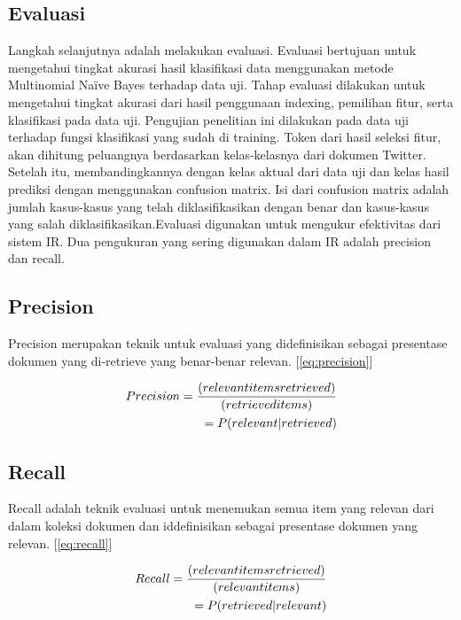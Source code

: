 \subsection*{Evaluasi}
Langkah selanjutnya adalah melakukan evaluasi. Evaluasi bertujuan untuk mengetahui tingkat akurasi hasil klasifikasi data menggunakan metode Multinomial Naïve Bayes terhadap data uji. Tahap evaluasi dilakukan untuk mengetahui tingkat akurasi dari hasil penggunaan indexing, pemilihan fitur, serta klasifikasi pada data uji. Pengujian penelitian ini dilakukan pada data uji terhadap fungsi klasifikasi yang sudah di training. Token dari hasil seleksi fitur, akan dihitung peluangnya berdasarkan kelas-kelasnya dari dokumen Twitter. Setelah itu, membandingkannya dengan kelas aktual dari data uji dan kelas hasil prediksi dengan menggunakan confusion matrix. Isi dari confusion matrix adalah jumlah kasus-kasus yang telah diklasifikasikan dengan benar dan kasus-kasus yang salah diklasifikasikan.Evaluasi digunakan untuk mengukur efektivitas dari sistem IR. Dua pengukuran yang sering digunakan dalam IR adalah precision dan recall.

\subsection*{Precision}
Precision merupakan teknik untuk evaluasi yang didefinisikan sebagai presentase dokumen yang di-retrieve yang benar-benar relevan. [\ref{eq:precision}]

\begin{equation}
	\begin{split}
		\tiny
		Precision = \frac{(relevant items retrieved)}{(retrieved items)} \\ 
		= P(relevant|retrieved)
		\label{eq:precision}
		\normalsize
	\end{split}
\end{equation}

\subsection*{Recall}
Recall adalah teknik evaluasi untuk menemukan semua item yang relevan dari dalam koleksi dokumen dan iddefinisikan sebagai presentase dokumen yang relevan. [\ref{eq:recall}]

\begin{equation}
\begin{split}
\tiny
Recall = \frac{(relevant items retrieved)}{(relevant items)} \\ 
= P(retrieved|relevant)
\label{eq:recall}
\normalsize
\end{split}
\end{equation}

